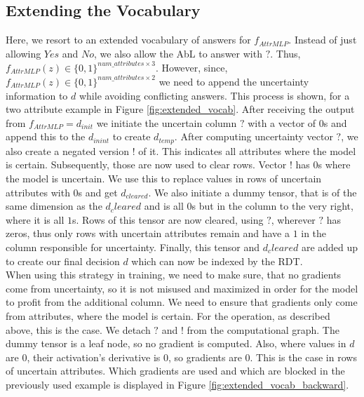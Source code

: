 \documentclass[a4paper,cleardoubleempty,BCOR1cm, 11pt]{report}
\begin{document}



\subsection{Extending the Vocabulary}
Here, we resort to an extended vocabulary of answers for $f_{AttrMLP}$. Instead of just allowing $Yes$ and $No$, we also allow the AbL to answer with $?$. Thus, $f_{AttrMLP}(z) \in \lbrace 0,1 \rbrace^{num\_attributes \times 3}$. However, since, $f_{AttrMLP}(z) \in \lbrace 0,1 \rbrace^{num\_attributes \times 2}$ we need to append the uncertainty information to $d$ while avoiding conflicting answers. This process is shown, for a two attribute example in Figure \ref{fig:extended_vocab}. After receiving the output from $f_{AttrMLP} = d_{init}$ we initiate the uncertain column $?$ with a vector of $0$s and append this to the $d_{inint}$ to create $d_{temp}$. After computing uncertainty vector $?$, we also create a negated version $!$ of it. This indicates all attributes where the model is certain. Subsequently, those are now used to clear rows. Vector $!$ has $0$s where the model is uncertain. We use this to replace values in rows of uncertain attributes with $0$s and get $d_{cleared}$. We also initiate a dummy tensor, that is of the same dimension as the $d_cleared$ and is all $0$s but in the column to the very right, where it is all $1$s. Rows of this tensor are now cleared, using $?$, wherever $?$ has zeros, thus only rows with uncertain attributes remain and have a $1$ in the column responsible for uncertainty. Finally, this tensor and $d_cleared$ are added up to create our final decision $d$ which can now be indexed by the RDT.\\
When using this strategy in training, we need to make sure, that no gradients come from uncertainty, so it is not misused and maximized in order for the model to profit from the additional column. We need to ensure that gradients only come from attributes, where the model is certain. For the operation, as described above, this is the case. We detach $?$ and $!$ from the computational graph. The dummy tensor is a leaf node, so no gradient is computed. Also, where values  in $d$ are $0$, their activation's derivative is $0$, so gradients are $0$. This is the case in rows of uncertain attributes. Which gradients are used and which are blocked in the previously used example is displayed in Figure \ref{fig:extended_vocab_backward}.
\end{document}
